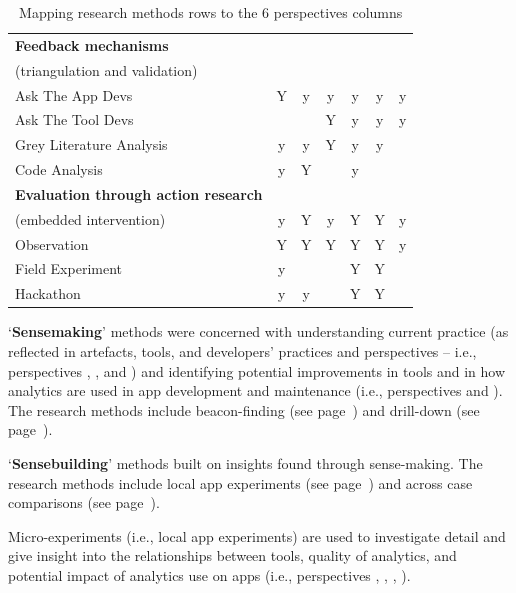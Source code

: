 \begin{table}
\begin{tabular}{l|ccc|ccc}
        \hline
        \textbf{Feedback mechanisms} & & & & & & \\
        (triangulation and validation) & & & & & & \\
        Ask The App Devs      &Y &y &y &y &y &y \\
        Ask The Tool Devs     &  &  &Y &y &y &y \\
        Grey Literature Analysis       &y &y &Y &y &y &  \\
        Code Analysis         &y &Y &  &y &  &  \\
                
        \hline
        \textbf{Evaluation through action research} & & & & & & \\
        (embedded intervention) &y &Y &y &Y &Y &y \\
        Observation             &Y &Y &Y &Y &Y &y \\
        Field Experiment        &y &  &  &Y &Y &  \\
        Hackathon               &y &y &  &Y &Y &  \\
        
        \bottomrule
    \end{tabular}
    \caption{Mapping research methods rows to the 6 perspectives columns}
    \label{tab:mapping-analysis-to-six-perspectives}
\end{table}


`\textbf{Sensemaking}' methods were concerned with understanding current practice (as reflected in artefacts, tools, and developers' practices and perspectives -- i.e., perspectives \uartefacts, \utools, and \uuse) and identifying potential improvements in tools and in how analytics are used in app development and maintenance (i.e., perspectives \itools and \iartefacts). The research methods include beacon-finding (see page~\pageref{section-beacon-finding-method}) and drill-down (see page~).


`\textbf{Sensebuilding}' methods built on insights found through sense-making. The research methods include local app experiments (see page~\pageref{local-app-experiments-research-method}) and across case comparisons (see page~\pageref{across-case-comparisons-research-method}).

Micro-experiments (i.e., local app experiments) are used to investigate detail and give insight into the relationships between tools, quality of analytics, and potential impact of analytics use on apps (i.e., perspectives \uartefacts, \utools, \iartefacts, \itools).

